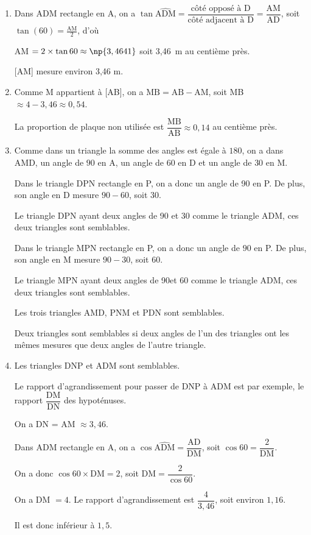 
\medskip

\begin{enumerate}
\item Dans ADM rectangle en A, on a  $\tan \widehat{\text{ADM}} = \dfrac{\text{côté opposé à D}}{\text{côté adjacent à D}} = \dfrac{\text{AM}}{\text{AD}}$, soit $\tan (60) = \frac{\text{AM}}{2}$, d'où

AM $= 2 \times \tan 60 \approx \np{3,4641}$ soit 3,46~m au centième près.
 
[AM] mesure environ 3,46 m. 
\item  Comme M appartient à  [AB], on a $\text{MB} = \text{AB} - \text{AM}$, 
soit MB $\approx 4 - 3,46 \approx  0,54$.

La proportion de plaque non utilisée est  $\dfrac{\text{MB}}{\text{AB}} \approx  0,14$ au centième près.
\item  Comme dans un triangle la somme des angles est égale à $180$\degres,
on a dans AMD, un angle de $90$\degres{} en A, un angle de $60$\degres{} en D et un angle de $30$\degres{} en M.

Dans le triangle DPN rectangle en P, on a donc un angle de 90\degres{} en P.
De plus, son angle en D mesure $90 - 60$, soit $30$\degres.

Le triangle DPN ayant deux angles de 90\degres{} et 30\degres{} comme le triangle ADM, ces deux triangles sont semblables.

Dans le triangle MPN rectangle en P, on a donc un angle de $90$\degres{} en P.
De plus, son angle en M mesure $90 - 30$, soit $60$\degres.

Le triangle MPN ayant deux angles de 90\degres et 60\degres{} comme le triangle ADM, ces deux triangles sont semblables.

Les trois triangles AMD, PNM et PDN sont semblables.
 
Deux triangles sont semblables si deux angles de l'un des triangles ont les mêmes mesures que deux angles de l'autre triangle.
\item  Les triangles DNP et ADM sont semblables.

Le rapport d'agrandissement pour passer de DNP à ADM est par exemple, le rapport $\dfrac{\text{DM}}{\text{DN}}$ des hypoténuses.

On a DN = AM $\approx 3,46$.

Dans ADM rectangle en A, on a  $\cos \widehat{\text{ADM}} = \dfrac{\text{AD}}{\text{DM}}$, soit $\cos 60 = \dfrac{2}{\text{DM}}$.

On a donc $\cos 60 \times \text{DM} = 2$, soit $\text{DM} = \dfrac{2}{\cos 60}$.

On a DM $= 4$.
Le rapport d'agrandissement est $\dfrac{4}{3,46}$, soit environ $1,16$.

Il est donc  inférieur à $1,5$.
\end{enumerate}

\bigskip

